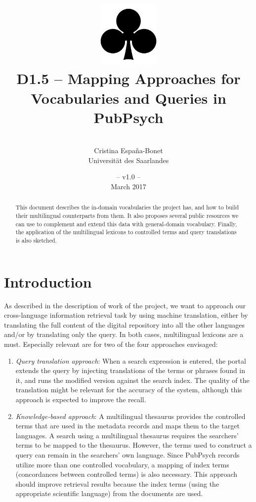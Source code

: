 \documentclass[a4paper,11pt]{article}
\title{
\includegraphics[width=3cm]{./img/200px-SuitClubs.png} \\
\Huge D1.5 -- Mapping Approaches for \\ Vocabularies and Queries in PubPsych }
\author{\vspace*{1cm}\\ \LARGE Cristina Espa\~na-Bonet \medskip \\ \Large Universit\"at des Saarlandes}
\date{\vspace*{2cm} -- v1.0 --\\March 2017}
\begin{document}
\clearpage\maketitle
\thispagestyle{empty}\thispagestyle{empty}

\vspace*{5cm}
\begin{abstract}
This document describes the in-domain vocabularies the project has, and how to build their multilingual counterparts from them. It also proposes several public resources we can use to complement and extend this data with general-domain vocabulary. Finally, the application of the multilingual lexicons to controlled terms and query translations is also sketched. 
\end{abstract}

\newpage
\tableofcontents
\clearpage


\section{Introduction}
\label{s:intro}

As described in the description of work of the project, we want to approach our cross-language information retrieval task by using machine translation, either by translating the full content of the digital repository into all the other languages and/or by translating only the query. In both cases, multilingual lexicons are a must. Especially relevant are for two of the four approaches envisaged:

\begin{enumerate}
 \item \emph{Query translation approach}: When a search expression is entered, the portal extends the query by injecting translations of the terms or phrases found in it, and runs the modified version against the search index. The quality of the translation might be relevant for the accuracy of the system, although this approach is expected to improve the recall.

 \item \emph{Knowledge-based approach}: A multilingual thesaurus provides the controlled terms that are used in the metadata records and maps them to the target languages. A search using a multilingual thesaurus requires the searchers' terms to be mapped to the thesaurus. However, the terms used to construct a query can remain in the searchers' own language. Since PubPsych records utilize more than one controlled vocabulary, a mapping of index terms (concordances between controlled terms) is also necessary. This approach should improve retrieval results because the index terms (using the appropriate scientific language) from the documents are used. 
\end{enumerate}
\end{document}
